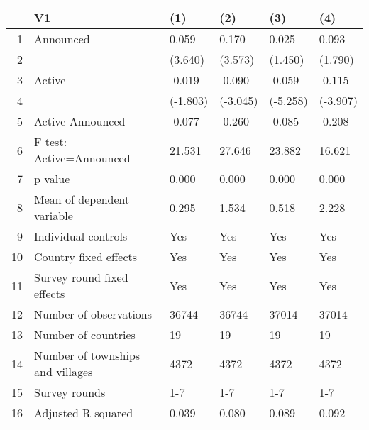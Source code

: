\begin{table}[ht]
\centering
\begin{tabular}{rlllll}
  \hline
 & V1 & (1) & (2) & (3) & (4) \\ 
  \hline
1 & Announced & 0.059 & 0.170 & 0.025 & 0.093 \\ 
  2 &  & (3.640) & (3.573) & (1.450) & (1.790) \\ 
  3 & Active & -0.019 & -0.090 & -0.059 & -0.115 \\ 
  4 &  & (-1.803) & (-3.045) & (-5.258) & (-3.907) \\ 
  5 & Active-Announced & -0.077 & -0.260 & -0.085 & -0.208 \\ 
  6 & F test: Active=Announced & 21.531 & 27.646 & 23.882 & 16.621 \\ 
  7 & p value & 0.000 & 0.000 & 0.000 & 0.000 \\ 
  8 & Mean of dependent variable & 0.295 & 1.534 & 0.518 & 2.228 \\ 
  9 & Individual controls & Yes & Yes & Yes & Yes \\ 
  10 & Country fixed effects & Yes & Yes & Yes & Yes \\ 
  11 & Survey round fixed effects & Yes & Yes & Yes & Yes \\ 
  12 & Number of observations & 36744 & 36744 & 37014 & 37014 \\ 
  13 & Number of countries & 19 & 19 & 19 & 19 \\ 
  14 & Number of townships and villages & 4372 & 4372 & 4372 & 4372 \\ 
  15 & Survey rounds & 1-7 & 1-7 & 1-7 & 1-7 \\ 
  16 & Adjusted R squared & 0.039 & 0.080 & 0.089 & 0.092 \\ 
   \hline
\end{tabular}
\end{table}
